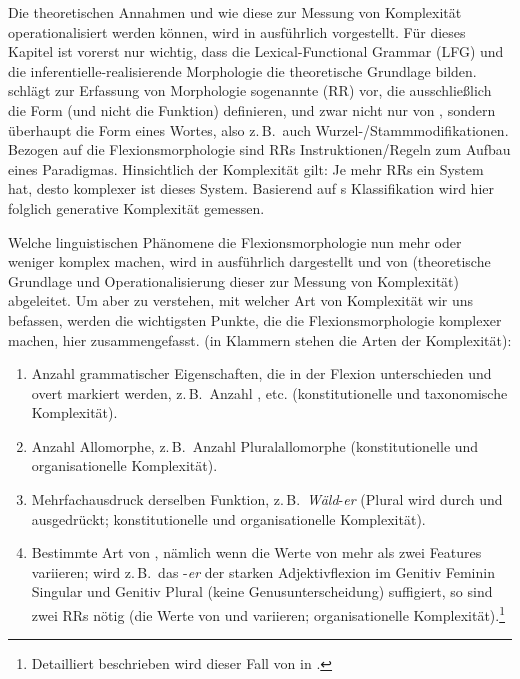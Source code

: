 Die theoretischen Annahmen und wie diese zur Messung von Komplexität operationalisiert werden können, wird in  ausführlich vorgestellt. Für dieses Kapitel ist vorerst nur wichtig, dass die Lexical-Functional Grammar (LFG) und die in\-fe\-ren\-tiel\-le-re\-a\-li\-sie\-ren\-de Morphologie die theoretische Grundlage bilden. \citet{Stump2001} schlägt zur Erfassung von Morphologie sogenannte  (RR) vor, die ausschließlich die Form (und nicht die Funktion) definieren, und zwar nicht nur von , sondern überhaupt die Form eines Wortes, also z.\,B.\ auch Wur\-zel-/Stamm\-mo\-di\-fi\-ka\-tio\-nen. Bezogen auf die Flexionsmorphologie sind RRs Instruktionen/Regeln zum Aufbau eines Paradigmas. Hinsichtlich der Komplexität gilt: Je mehr RRs ein System hat, desto komplexer ist dieses System. Basierend auf \citeauthor{Rescher1998}s \citeyearpar{Rescher1998} Klassifikation wird hier folglich generative Komplexität gemessen.

Welche linguistischen Phänomene die Flexionsmorphologie nun mehr oder weniger komplex machen, wird in  ausführlich dargestellt und von  (theoretische Grundlage und Operationalisierung dieser zur Messung von Komplexität) abgeleitet. Um aber zu verstehen, mit welcher Art von Komplexität wir uns befassen, werden die wichtigsten Punkte, die die Flexionsmorphologie komplexer machen, hier zusammengefasst. (in Klammern stehen die Arten der Komplexität):

\begin{enumerate}
\item 
Anzahl grammatischer Eigenschaften, die in der Flexion unterschieden und overt markiert werden, z.\,B.\ Anzahl ,  etc. (konstitutionelle und taxonomische Komplexität).
\item 
Anzahl Allomorphe, z.\,B.\ Anzahl Pluralallomorphe (konstitutionelle und organisationelle Komplexität).
\item 
Mehrfachausdruck derselben Funktion, z.\,B.\ \textit{Wäld}-\textit{er} (Plural wird durch  und  ausgedrückt; konstitutionelle und organisationelle Komplexität).
\item 
Bestimmte Art von , nämlich wenn die Werte von mehr als zwei Features variieren; wird z.\,B.\ das  -\textit{er} der starken Adjektivflexion im Genitiv Feminin Singular und Genitiv Plural (keine Genusunterscheidung) suffigiert, so sind zwei RRs nötig (die Werte von  und  variieren; organisationelle Komplexität).\footnote{Detailliert beschrieben wird dieser Fall von  in .}
\end{enumerate}

